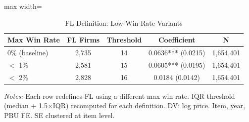 \begin{table}[htbp]
\centering
\caption{FL Definition: Low-Win-Rate Variants}
\label{tab:fl_lowwinrate}
\begin{adjustbox}{max width=\textwidth}
\begin{threeparttable}
\small
\begin{tabular}{lcccc}
\toprule
Max Win Rate & FL Firms & Threshold & Coefficient & N \\
\midrule
0\% (baseline) & 2,735 & 14 & 0.0636*** (0.0215) & 1,654,401 \\
$<$ 1\% & 2,581 & 15 & 0.0605*** (0.0195) & 1,654,401 \\
$<$ 2\% & 2,828 & 16 & 0.0184 (0.0142) & 1,654,401 \\
\bottomrule
\end{tabular}
\begin{tablenotes}
\small
\item \textit{Notes:} Each row redefines FL using a different max win rate.
IQR threshold (median + 1.5$\times$IQR) recomputed for each definition.
DV: log price. Item, year, PBU FE. SE clustered at item level.
\end{tablenotes}
\end{threeparttable}
\end{adjustbox}
\end{table}
